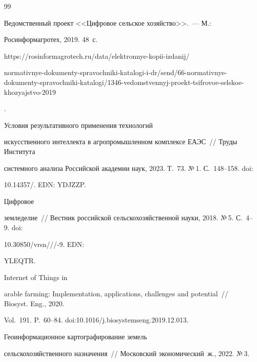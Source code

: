   

{\small\frenchspacing

{%


\begin{thebibliography}{99}


Ведомственный проект <<Цифровое сельское хозяйство>>.~--- М.: 

Росинформагротех, 2019. 48~с. {\sf https://rosinformagrotech.ru/data/elektronnye-kopii-izdanij/

normativnye-dokumenty-spravochniki-katalogi-i-dr/send/66-normativnye-dokumenty-spravochniki-katalogi/1346-vedomstvennyj-proekt-tsifrovoe-selskoe-khozyajstvo-2019}.


 Условия результативного применения технологий 

искусственного интеллекта в агропромышленном комплексе ЕАЭС~/\!\!/ Труды Института 

системного анализа Российской академии наук, 2023. Т.~73. №\,1. С.~148--158. doi: 

10.14357\!/. EDN: YDJZZP.


 Цифровое 

земледелие~/\!\!/ Вестник российской сельскохозяйственной науки, 2018. №\,5. С.~4--9. doi: 

10.30850\!/\!vrsn\!/\!/\!/-9. EDN: 

YLEQTR.




 Internet of Things in 

arable farming: Implementation, applications, challenges and potential~/\!\!/ Biosyst. Eng., 2020. 

Vol.~191. P.~60--84. doi:10.1016\!/\!j.biosystemseng.2019.12.013.




 Геоинформационное картографирование земель 

сельскохозяйственного назначения~/\!\!/ Московский экономический~ж., 2022. №\,3. 


\end{thebibliography}}}

